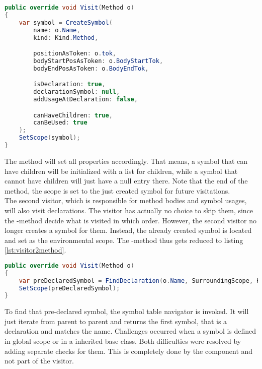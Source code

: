 \begin{lstlisting}[language=csharp, caption={Visiting a Method, First Visitor}, captionpos=b, label={lst:visitorvisit1}]
public override void Visit(Method o)
{
    var symbol = CreateSymbol(
        name: o.Name,
        kind: Kind.Method,

        positionAsToken: o.tok,
        bodyStartPosAsToken: o.BodyStartTok,
        bodyEndPosAsToken: o.BodyEndTok,

        isDeclaration: true,
        declarationSymbol: null,
        addUsageAtDeclaration: false,

        canHaveChildren: true,
        canBeUsed: true
    );
    SetScope(symbol);
}
\end{lstlisting}

The  method will set all properties accordingly.
That means, a symbol that can have children will be initialized with a list for children,
while a symbol that cannot have children will just have a null entry there.
Note that the end of the method, the scope is set to the just created symbol for future visitations.\\

The second visitor, which is responsible for method bodies and symbol usages,
will also visit declarations.
The visitor has actually no choice to skip them, since the -method decide what is visited in which order.
However, the second visitor no longer creates a symbol for them.
Instead, the already created symbol is located and set as the environmental scope.
The -method thus gets reduced to listing \ref{lst:visitor2method}.

\begin{lstlisting}[language=csharp, caption={Visiting a Method, Second Visitor}, captionpos=b, label={lst:visitor2method}]
public override void Visit(Method o)
{
    var preDeclaredSymbol = FindDeclaration(o.Name, SurroundingScope, Kind.Method);
    SetScope(preDeclaredSymbol);
}
\end{lstlisting}

To find that pre-declared symbol, the symbol table navigator is invoked.
It will just iterate from parent to parent and returns the first symbol, that is a declaration and matches the name.
Challenges occurred when a symbol is defined in global scope or in a inherited base class.
Both difficulties were resolved by adding separate checks for them.
This is completely done by the  component and not part of the visitor.

